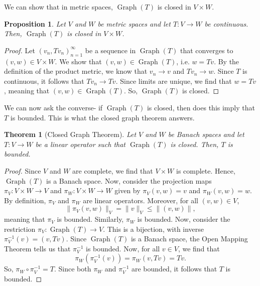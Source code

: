 \documentclass[a4paper, openany]{memoir}
\theoremstyle{definition}
\theoremstyle{plain}
\newtheorem{theorem}[definition]{Theorem}
\newtheorem{proposition}[definition]{Proposition}
\begin{document}
    We can show that in metric spaces, $\operatorname{Graph}(T)$ is closed in $V \times W$.
    \begin{proposition}
        Let $V$ and $W$ be metric spaces and let $T \colon V \to W$ be continuous. Then, $\operatorname{Graph}(T)$ is closed in $V \times W$.
    \end{proposition}
    \begin{proof}
        Let $(v_n, Tv_n)_{n=1}^\infty$ be a sequence in $\operatorname{Graph}(T)$ that converges to $(v, w) \in V \times W$. We show that $(v, w) \in \operatorname{Graph}(T)$, i.e. $w = Tv$. By the definition of the product metric, we know that $v_n \to v$ and $Tv_n \to w$. Since $T$ is continuous, it follows that $Tv_n \to Tv$. Since limits are unique, we find that $w = Tv$, meaning that $(v, w) \in \operatorname{Graph}(T)$. So, $\operatorname{Graph}(T)$ is closed.
    \end{proof}
    \noindent We can now ask the converse- if $\operatorname{Graph}(T)$ is closed, then does this imply that $T$ is bounded. This is what the closed graph theorem answers.
    \begin{theorem}[Closed Graph Theorem]
        Let $V$ and $W$ be Banach spaces and let $T \colon V \to W$ be a linear operator such that $\operatorname{Graph}(T)$ is closed. Then, $T$ is bounded.
    \end{theorem}
    \begin{proof}
        Since $V$ and $W$ are complete, we find that $V \times W$ is complete. Hence, $\operatorname{Graph}(T)$ is a Banach space. Now, consider the projection maps $\pi_V \colon V \times W \to V$ and $\pi_W \colon V \times W \to W$ given by $\pi_V(v, w) = v$ and $\pi_W(v, w) = w$. By definition, $\pi_V$ and $\pi_W$ are linear operators. Moreover, for all $(v, w) \in V$,
        \[\lVert \pi_V(v, w) \rVert_V = \lVert v \rVert_V \leq \lVert (v, w) \rVert,\]
        meaning that $\pi_V$ is bounded. Similarly, $\pi_W$ is bounded. Now, consider the restriction $\pi_V \colon \operatorname{Graph}(T) \to V$. This is a bijection, with inverse $\pi_V^{-1}(v) = (v, Tv)$. Since $\operatorname{Graph}(T)$ is a Banach space, the Open Mapping Theorem tells us that $\pi_V^{-1}$ is bounded. Now, for all $v \in V$, we find that 
        \[\pi_W(\pi_V^{-1}(v)) = \pi_W(v, Tv) = Tv.\]
        So, $\pi_W \circ \pi_V^{-1} = T$. Since both $\pi_W$ and $\pi_V^{-1}$ are bounded, it follows that $T$ is bounded.
    \end{proof}
    \newpage
\end{document}
